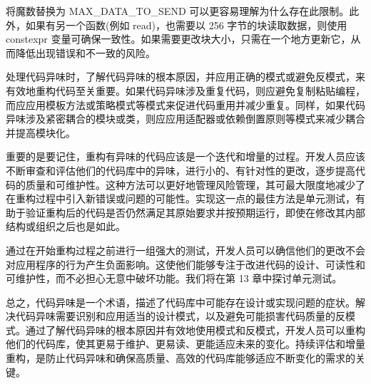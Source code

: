 
将魔数替换为 MAX\_DATA\_TO\_SEND 可以更容易理解为什么存在此限制。此外，如果有另一个函数(例如 read)，也需要以 256 字节的块读取数据，则使用 constexpr 变量可确保一致性。如果需要更改块大小，只需在一个地方更新它，从而降低出现错误和不一致的风险。

处理代码异味时，了解代码异味的根本原因，并应用正确的模式或避免反模式，来有效地重构代码至关重要。如果代码异味涉及重复代码，则应避免复制粘贴编程，而应应用模板方法或策略模式等模式来促进代码重用并减少重复。同样，如果代码异味涉及紧密耦合的模块或类，则应应用适配器或依赖倒置原则等模式来减少耦合并提高模块化。

重要的是要记住，重构有异味的代码应该是一个迭代和增量的过程。开发人员应该不断审查和评估他们的代码库中的异味，进行小的、有针对性的更改，逐步提高代码的质量和可维护性。这种方法可以更好地管理风险管理，其可最大限度地减少了在重构过程中引入新错误或问题的可能性。实现这一点的最佳方法是单元测试，有助于验证重构后的代码是否仍然满足其原始要求并按预期运行，即使在修改其内部结构或组织之后也是如此。

通过在开始重构过程之前进行一组强大的测试，开发人员可以确信他们的更改不会对应用程序的行为产生负面影响。这使他们能够专注于改进代码的设计、可读性和可维护性，而不必担心无意中破坏功能。我们将在第 13 章中探讨单元测试。

总之，代码异味是一个术语，描述了代码库中可能存在设计或实现问题的症状。解决代码异味需要识别和应用适当的设计模式，以及避免可能损害代码质量的反模式。通过了解代码异味的根本原因并有效地使用模式和反模式，开发人员可以重构他们的代码库，使其更易于维护、更易读、更能适应未来的变化。持续评估和增量重构，是防止代码异味和确保高质量、高效的代码库能够适应不断变化的需求的关键。














